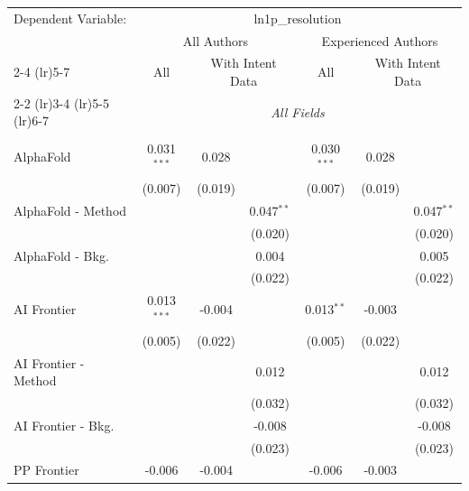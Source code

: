 \begingroup
\centering
\begin{tabular}{lcccccc}
   \tabularnewline \midrule \midrule
   Dependent Variable: & \multicolumn{6}{c}{ln1p\_resolution}\\
 & \multicolumn{3}{c}{All Authors} & \multicolumn{3}{c}{Experienced Authors} \\
\cmidrule(lr){2-4} \cmidrule(lr){5-7}
 & \multicolumn{1}{c}{All} & \multicolumn{2}{c}{With Intent Data} & \multicolumn{1}{c}{All} & \multicolumn{2}{c}{With Intent Data} \\
\cmidrule(lr){2-2} \cmidrule(lr){3-4} \cmidrule(lr){5-5} \cmidrule(lr){6-7}
 & \multicolumn{6}{c}{\textit{All Fields}} \\ \\
   AlphaFold            & 0.031$^{***}$ & 0.028   &              & 0.030$^{***}$ & 0.028   &   \\   
                        & (0.007)       & (0.019) &              & (0.007)       & (0.019) &   \\   
   AlphaFold - Method   &               &         & 0.047$^{**}$ &               &         & 0.047$^{**}$\\   
                        &               &         & (0.020)      &               &         & (0.020)\\   
   AlphaFold - Bkg.     &               &         & 0.004        &               &         & 0.005\\   
                        &               &         & (0.022)      &               &         & (0.022)\\   
   AI Frontier          & 0.013$^{***}$ & -0.004  &              & 0.013$^{**}$  & -0.003  &   \\   
                        & (0.005)       & (0.022) &              & (0.005)       & (0.022) &   \\   
   AI Frontier - Method &               &         & 0.012        &               &         & 0.012\\   
                        &               &         & (0.032)      &               &         & (0.032)\\   
   AI Frontier - Bkg.   &               &         & -0.008       &               &         & -0.008\\   
                        &               &         & (0.023)      &               &         & (0.023)\\   
   PP Frontier          & -0.006        & -0.004  &              & -0.006        & -0.003  &   \\   

\end{tabular}
